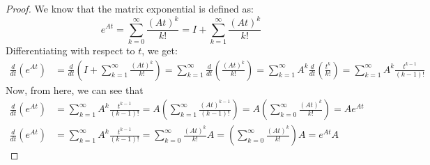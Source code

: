 \begin{proof}
      We know that the matrix exponential is defined as:
      \begin{equation*}
            e^{A t}
            =
            \sum_{k=0}^{\infty} \frac{{(A t)}^{k}}{k !}
            =
            I + \sum_{k=1}^{\infty} \frac{{(A t)}^{k}}{k !}
      \end{equation*}
      Differentiating with respect to \( t \), we get:
      \begin{align*}
            \frac{d}{d t}\left(e^{A t}\right)
             & =
            \frac{d}{d t}\left(I + \sum_{k=1}^{\infty} \frac{{(A t)}^{k}}{k !}\right)
            =
            \sum_{k=1}^{\infty} \frac{d}{d t}\left(\frac{{(A t)}^{k}}{k !}\right)
            =
            \sum_{k=1}^{\infty} A^k \frac{d}{d t}\left(\frac{t^k}{k !}\right)
            =
            \sum_{k=1}^{\infty} A^k \frac{t^{k-1}}{(k-1) !}
      \end{align*}
      Now, from here, we can see that
      \begin{align*}
            \frac{d}{d t}\left(e^{A t}\right)
             & =
            \sum_{k=1}^{\infty} A^k \frac{t^{k-1}}{(k-1) !}
            =
            A \left( \sum_{k=1}^{\infty} \frac{{(A t)}^{k-1}}{(k-1) !} \right)
            =
            A \left( \sum_{k=0}^{\infty} \frac{{(A t)}^{k}}{k !} \right)
            = A e^{A t}
            \\
            \frac{d}{d t}\left(e^{A t}\right)
             & =
            \sum_{k=1}^{\infty} A^k \frac{t^{k-1}}{(k-1) !}
            =
            \sum_{k=0}^{\infty} \frac{{(A t)}^{k}}{k !} A
            =
            \left( \sum_{k=0}^{\infty} \frac{{(A t)}^{k}}{k !} \right) A
            = e^{A t} A
      \end{align*}
\end{proof}
